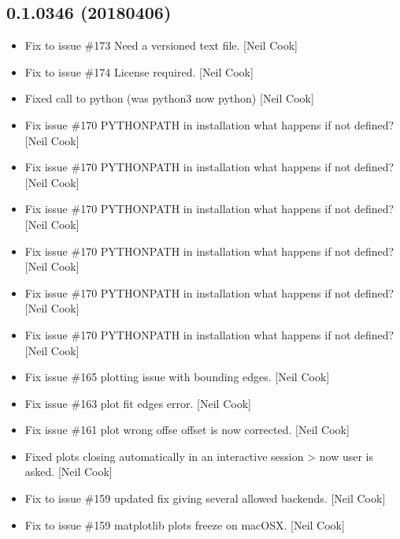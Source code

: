 \documentclass[a4paper,10pt,english]{report}
\begin{document}
\subsection{0.1.0346 (2018\sphinxhyphen{}04\sphinxhyphen{}06)}
\label{\detokenize{misc/changelog:id486}}\begin{itemize}
\item {} 
Fix to issue \#173 \sphinxhyphen{} Need a versioned text file. {[}Neil Cook{]}

\item {} 
Fix to issue \#174 \sphinxhyphen{} License required. {[}Neil Cook{]}

\item {} 
Fixed call to python (was python3 now python) {[}Neil Cook{]}

\item {} 
Fix issue \#170 \sphinxhyphen{} PYTHONPATH in installation \sphinxhyphen{} what happens if not
defined? {[}Neil Cook{]}

\item {} 
Fix issue \#170 \sphinxhyphen{} PYTHONPATH in installation \sphinxhyphen{} what happens if not
defined? {[}Neil Cook{]}

\item {} 
Fix issue \#170 \sphinxhyphen{} PYTHONPATH in installation \sphinxhyphen{} what happens if not
defined? {[}Neil Cook{]}

\item {} 
Fix issue \#170 \sphinxhyphen{} PYTHONPATH in installation \sphinxhyphen{} what happens if not
defined? {[}Neil Cook{]}

\item {} 
Fix issue \#170 \sphinxhyphen{} PYTHONPATH in installation \sphinxhyphen{} what happens if not
defined? {[}Neil Cook{]}

\item {} 
Fix issue \#170 \sphinxhyphen{} PYTHONPATH in installation \sphinxhyphen{} what happens if not
defined? {[}Neil Cook{]}

\item {} 
Fix issue \#165 \sphinxhyphen{}  plotting issue with bounding edges. {[}Neil
Cook{]}

\item {} 
Fix issue \#163 \sphinxhyphen{}  plot fit edges error. {[}Neil Cook{]}

\item {} 
Fix issue \#161 \sphinxhyphen{}  plot wrong offse \sphinxhyphen{} offset is now corrected.
{[}Neil Cook{]}

\item {} 
Fixed plots closing automatically in an interactive session \textendash{}\textgreater{} now
user is asked. {[}Neil Cook{]}

\item {} 
Fix to issue \#159 \sphinxhyphen{} updated fix giving several allowed backends. {[}Neil
Cook{]}

\item {} 
Fix to issue \#159 \sphinxhyphen{} matplotlib plots freeze on macOSX. {[}Neil Cook{]}

\end{itemize}
\end{document}
